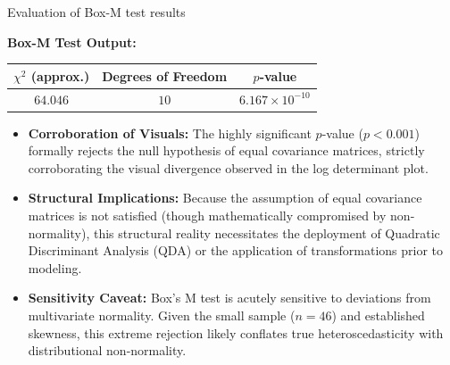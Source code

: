 \documentclass[8pt, aspectratio=169]{beamer}
\begin{document}
\begin{frame}{Evaluation of Box-M test results}
    
    \textbf{Box-M Test Output:}
    \begin{table}
        \centering
        \begin{tabular}{ccc}
            \toprule
            \textbf{$\chi^2$ (approx.)} & \textbf{Degrees of Freedom} & \textbf{$p$-value} \\
            \midrule
            $64.046$ & $10$ & $6.167 \times 10^{-10}$ \\
            \bottomrule
        \end{tabular}
    \end{table}

    \vspace{0.4cm}
    \begin{itemize}
        \item \textbf{Corroboration of Visuals:} The highly significant $p$-value ($p < 0.001$) formally rejects the null hypothesis of equal covariance matrices, strictly corroborating the visual divergence observed in the log determinant plot.
        \item \textbf{Structural Implications:} Because the assumption of equal covariance matrices is not satisfied (though mathematically compromised by non-normality), this structural reality necessitates the deployment of Quadratic Discriminant Analysis (QDA) or the application of transformations prior to modeling.
        \item \textbf{Sensitivity Caveat:} Box's M test is acutely sensitive to deviations from multivariate normality. Given the small sample ($n=46$) and established skewness, this extreme rejection likely conflates true heteroscedasticity with distributional non-normality.

    \end{itemize}
\end{frame}
\end{document}
